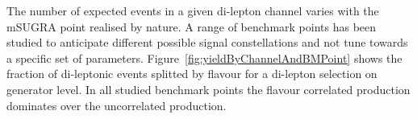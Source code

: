 The number of expected events in a given di-lepton channel varies with the mSUGRA point realised by nature. 
A range of benchmark points has been studied to anticipate different possible signal constellations and not
tune towards a specific set of parameters. 
Figure~\ref{fig:yieldByChannelAndBMPoint} shows the fraction of di-leptonic events splitted by flavour
for a di-lepton selection on generator level. In all studied benchmark points
the flavour correlated production dominates over the uncorrelated production.


